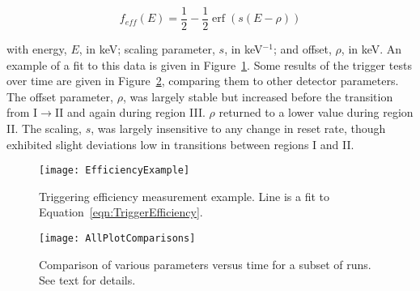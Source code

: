 				\begin{equation}
					f_{eff}(E) = \frac{1}{2} - \frac{1}{2} \operatorname{erf} \left( s ( E-\rho ) \right)
					\label{eqn:TriggerEfficiency}
				\end{equation}
				
with energy, $E$, in keV; scaling parameter, $s$, in keV$^{-1}$; and offset, $\rho$, in keV.  An example of a fit to this data is given in Figure~\ref{fig:PPC2TriggeringEfficiencyExample}.  Some results of the trigger tests over time are given in Figure~\ref{fig:PPC2AllPlotCompare}, comparing them to other detector parameters.  The offset parameter, $\rho$, was largely stable but increased before the transition from I$\to$II and again during region III.  $\rho$ returned to a lower value during region II.  The scaling, $s$, was largely insensitive to any change in reset rate, though exhibited slight deviations low in transitions between regions I and II.  

				\begin{figure}
					\centering
					\texttt{[image: EfficiencyExample]}
					\caption[Triggering efficiency measurement example]
					{Triggering efficiency measurement example.  Line is a fit to 
					Equation~\ref{eqn:TriggerEfficiency}.}
					\label{fig:PPC2TriggeringEfficiencyExample}
				\end{figure}
	

			
				\begin{figure}
					\centering
					\texttt{[image: AllPlotComparisons]}
					\caption[Comparison of various parameters versus time for a subset of runs]
					{Comparison of various parameters versus time for a subset of runs.  See text for details.}
					\label{fig:PPC2AllPlotCompare}
				\end{figure}
	
